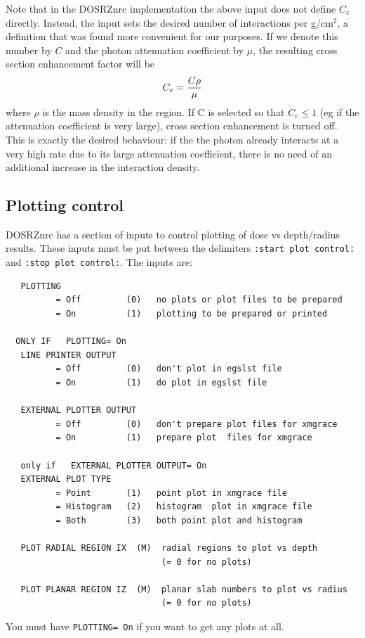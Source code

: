 \documentclass[12pt,twoside]{article}  %
\begin{document}
Note that in the DOSRZnrc implementation the above input does not define 
$C_e$ directly. Instead, the input sets the desired number of interactions 
per g/cm$^2$, a definition that was found more convenient for our purposes. 
If we denote this number by $C$ and the photon attenuation coefficient 
by $\mu$, the resulting cross section enhancement factor will be
\begin{equation}
C_e = {C \rho \over \mu}
\end{equation}
where $\rho$ is the mass density in the region. If C is selected
so that $C_e \le 1$ (eg if the attenuation coefficient is very large),
cross section enhancement is turned off. This is exactly the desired
behaviour: if the the photon already interacts at a very high rate due
to its large attenuation coefficient, there is no need of an additional
increase in the interaction density.


\subsection{Plotting control}
\label{dosrzplotsect}

DOSRZnrc has a section of inputs to control plotting of dose
vs depth/radius results.  These inputs must be put between the delimiters
{\tt :start plot control:} and {\tt :stop plot control:}.  The
inputs are:
\begin{verbatim}
   PLOTTING
          = Off         (0)   no plots or plot files to be prepared
          = On          (1)   plotting to be prepared or printed

  ONLY IF   PLOTTING= On
   LINE PRINTER OUTPUT
          = Off         (0)   don't plot in egslst file
          = On          (1)   do plot in egslst file

   EXTERNAL PLOTTER OUTPUT
          = Off         (0)   don't prepare plot files for xmgrace
          = On          (1)   prepare plot  files for xmgrace

   only if   EXTERNAL PLOTTER OUTPUT= On
   EXTERNAL PLOT TYPE
          = Point       (1)   point plot in xmgrace file
          = Histogram   (2)   histogram  plot in xmgrace file
          = Both        (3)   both point plot and histogram

   PLOT RADIAL REGION IX  (M)  radial regions to plot vs depth
                               (= 0 for no plots)

   PLOT PLANAR REGION IZ  (M)  planar slab numbers to plot vs radius
                               (= 0 for no plots)   
\end{verbatim}
You must have {\tt PLOTTING= On} if you want to get any plots at all.
\end{document}
